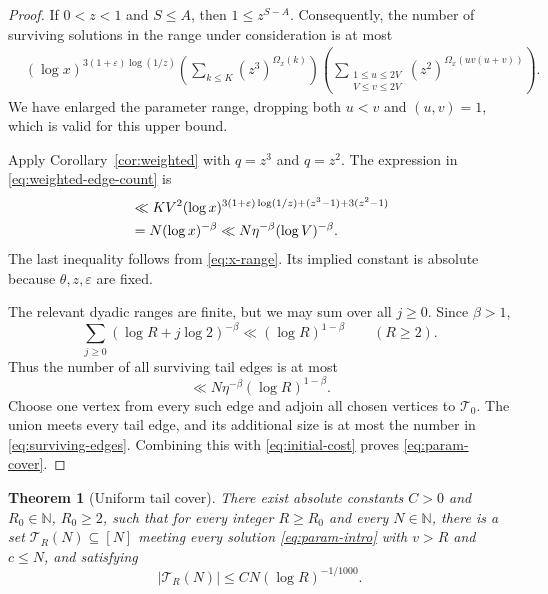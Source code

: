 \documentclass[11pt]{article}
\newtheorem{theorem}{Theorem}[section]
\theoremstyle{definition}
\theoremstyle{remark}
\numberwithin{equation}{section}
\newcommand{\N}{\mathbb N}
\newcommand{\eps}{\varepsilon}
\begin{document}
\begin{proof}
If \(0<z<1\) and \(S\le A\), then \(1\le z^{S-A}\).
Consequently, the number of surviving solutions in the range
under consideration is at most
\begin{align}
 &(\log x)^{3(1+\eps)\log(1/z)}
 \left(\sum_{k\le K}(z^3)^{\Omega_x(k)}\right)
 \left(
 \sum_{\substack{1\le u\le2V\\V\le v\le2V}}
 (z^2)^{\Omega_x(uv(u+v))}
 \right).
 \label{eq:weighted-edge-count}
\end{align}
We have enlarged the parameter range, dropping both \(u<v\)
and \((u,v)=1\), which is valid for this upper bound.

Apply Corollary~\ref{cor:weighted} with \(q=z^3\) and \(q=z^2\).
The expression in \eqref{eq:weighted-edge-count} is
\begin{align}
 &\ll KV^2
 (\log x)^{3(1+\eps)\log(1/z)+(z^3-1)+3(z^2-1)}
 \notag\\
 &=N(\log x)^{-\beta}
 \ll N\eta^{-\beta}(\log V)^{-\beta}.
 \label{eq:dyadic-bound}
\end{align}
The last inequality follows from \eqref{eq:x-range}. Its implied
constant is absolute because \(\theta,z,\eps\) are fixed.

The relevant dyadic ranges are finite, but we may sum over all
\(j\ge0\). Since \(\beta>1\),
\[
 \sum_{j\ge0}(\log R+j\log2)^{-\beta}
 \ll(\log R)^{1-\beta}
 \qquad(R\ge2).
\]
Thus the number of all surviving tail edges is at most
\begin{equation}\label{eq:surviving-edges}
 \ll N\eta^{-\beta}(\log R)^{1-\beta}.
\end{equation}
Choose one vertex from every such edge and adjoin all chosen
vertices to \(\mathcal T_0\). The union meets every tail edge,
and its additional size is at most the number in
\eqref{eq:surviving-edges}. Combining this with
\eqref{eq:initial-cost} proves \eqref{eq:param-cover}.
\end{proof}

\begin{theorem}[Uniform tail cover]\label{thm:tail}
There exist absolute constants \(C>0\) and
\(R_0\in\N\), \(R_0\ge2\), such that for every integer \(R\ge R_0\)
and every \(N\in\N\), there is a set
\(\mathcal T_R(N)\subseteq[N]\) meeting every solution
\eqref{eq:param-intro} with \(v>R\) and \(c\le N\), and satisfying
\begin{equation}\label{eq:tail-cover}
 |\mathcal T_R(N)|\le CN(\log R)^{-1/1000}.
\end{equation}
\end{theorem}
\end{document}
